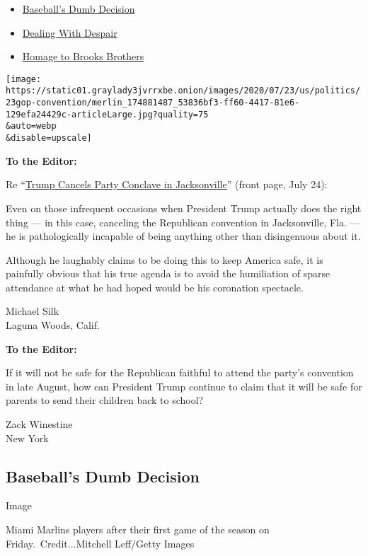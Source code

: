\begin{itemize}
\tightlist
\item
  \protect\hyperlink{link-5ace5a03}{Baseball's Dumb Decision}
\item
  \protect\hyperlink{link-6baaeb6c}{Dealing With Despair}
\item
  \protect\hyperlink{link-785352e7}{Homage to Brooks Brothers}
\end{itemize}

\texttt{[image: https://static01.graylady3jvrrxbe.onion/images/2020/07/23/us/politics/23gop-convention/merlin\_174881487\_53836bf3-ff60-4417-81e6-129efa24429c-articleLarge.jpg?quality=75\\\&auto=webp\\\&disable=upscale]}

\textbf{To the Editor:}

Re
``\href{https://www.nytimes3xbfgragh.onion/2020/07/23/us/politics/jacksonville-rnc.html}{Trump
Cancels Party Conclave in Jacksonville}'' (front page, July 24):

Even on those infrequent occasions when President Trump actually does
the right thing --- in this case, canceling the Republican convention in
Jacksonville, Fla. --- he is pathologically incapable of being anything
other than disingenuous about it.

Although he laughably claims to be doing this to keep America safe, it
is painfully obvious that his true agenda is to avoid the humiliation of
sparse attendance at what he had hoped would be his coronation
spectacle.

Michael Silk\\
Laguna Woods, Calif.

\textbf{To the Editor:}

If it will not be safe for the Republican faithful to attend the party's
convention in late August, how can President Trump continue to claim
that it will be safe for parents to send their children back to school?

Zack Winestine\\
New York

\hypertarget{baseballs-dumb-decision}{%
\subsection{Baseball's Dumb Decision}\label{baseballs-dumb-decision}}

Image

Miami Marlins players after their first game of the season on
Friday.~Credit...Mitchell Leff/Getty Images

